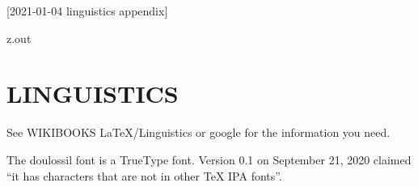 [2021-01-04 linguistics appendix]

\begin{VerbatimOut}{z.out}
\chapter{LINGUISTICS}

See WIKIBOOKS \LaTeX/Linguistics \cite{wikibooks-latex-linguistics}
or google for the information you need.

The doulossil font \cite{tambe2020}
is a TrueType font.
Version 0.1 on September 21, 2020 claimed
``it has characters that are not in other TeX IPA fonts''.
\end{VerbatimOut}

\MyIOT
